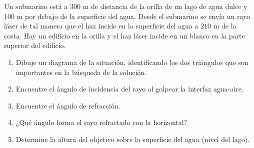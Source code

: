\item Un submarino está a $300\text{ m}$ de distancia de la orilla de un lago de agua dulce y $100\text{ m}$ por debajo de la superficie del agua. Desde el submarino se envía un rayo láser de tal manera que el haz incide en la superficie del agua a $210\text{ m}$ de la costa. Hay un edificio en la orilla y el haz láser incide en un blanco en la parte superior del edificio.
\begin{enumerate}
    \item Dibuje un diagrama de la situación, identificando los dos triángulos que son importantes en la búsqueda de la solución.
    \item Encuentre el ángulo de incidencia del rayo al golpear la interfaz agua-aire.
    \item Encuentre el ángulo de refracción.
    \item ¿Qué ángulo forma el rayo refractado con la horizontal?
    \item Determine la altura del objetivo sobre la superficie del agua (nivel del lago).
\end{enumerate}